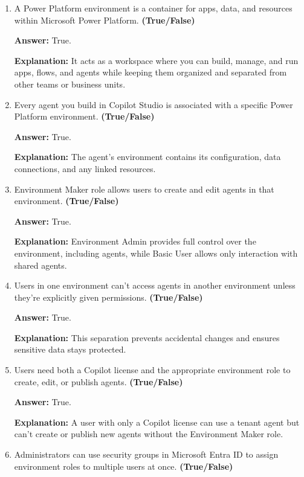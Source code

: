 \documentclass[10pt]{article}
\begin{document}
\begin{enumerate}[leftmargin=*]
\textbf{Explanation:} Environment roles control whether users can create, edit, manage, or publish agents, while Basic User allows only interaction with shared agents.

\item A Power Platform environment is a container for apps, data, and resources within Microsoft Power Platform. \textbf{(True/False)}

\textbf{Answer:} True.

\textbf{Explanation:} It acts as a workspace where you can build, manage, and run apps, flows, and agents while keeping them organized and separated from other teams or business units.

\item Every agent you build in Copilot Studio is associated with a specific Power Platform environment. \textbf{(True/False)}

\textbf{Answer:} True.

\textbf{Explanation:} The agent’s environment contains its configuration, data connections, and any linked resources.

\item Environment Maker role allows users to create and edit agents in that environment. \textbf{(True/False)}

\textbf{Answer:} True.

\textbf{Explanation:} Environment Admin provides full control over the environment, including agents, while Basic User allows only interaction with shared agents.

\item Users in one environment can’t access agents in another environment unless they’re explicitly given permissions. \textbf{(True/False)}

\textbf{Answer:} True.

\textbf{Explanation:} This separation prevents accidental changes and ensures sensitive data stays protected.

\item Users need both a Copilot license and the appropriate environment role to create, edit, or publish agents. \textbf{(True/False)}

\textbf{Answer:} True.

\textbf{Explanation:} A user with only a Copilot license can use a tenant agent but can’t create or publish new agents without the Environment Maker role.

\item Administrators can use security groups in Microsoft Entra ID to assign environment roles to multiple users at once. \textbf{(True/False)}


\end{enumerate}
\end{document}
